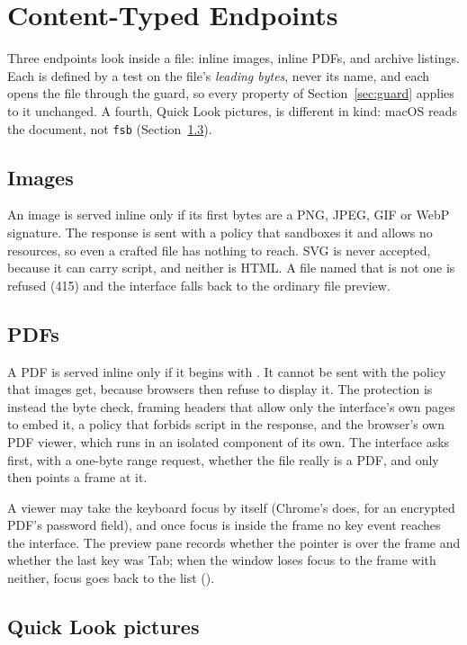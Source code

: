 \section{Content-Typed Endpoints}
\label{sec:content}

Three endpoints look inside a file: inline images, inline PDFs, and archive listings.  Each is
defined by a test on the file's \emph{leading bytes}, never its name, and each opens the file
through the guard, so every property of Section~\ref{sec:guard} applies to it unchanged.  A
fourth, Quick Look pictures, is different in kind: macOS reads the document, not
\texttt{fsb} (Section~\ref{sec:quicklook}).

\subsection{Images}

An image is served inline only if its first bytes are a PNG, JPEG, GIF or WebP signature.
The response is sent with a policy that sandboxes it and allows no resources, so even a
crafted file has nothing to reach.  SVG is never accepted, because it can carry script, and
neither is HTML.  A file named  that is not one is refused (415) and the interface
falls back to the ordinary file preview.

\subsection{PDFs}

A PDF is served inline only if it begins with .  It cannot be sent with the
 policy that images get, because browsers then refuse to display it.  The
protection is instead the byte check, framing headers that allow only the interface's own
pages to embed it, a policy that forbids script in the response, and the browser's own PDF
viewer, which runs in an isolated component of its own.  The interface asks first, with a
one-byte range request, whether the file really is a PDF, and only then points a frame at it.

A viewer may take the keyboard focus by itself (Chrome's does, for an encrypted PDF's
password field), and once focus is inside the frame no key event reaches the interface.  The
preview pane records whether the pointer is over the frame and whether the last key was Tab;
when the window loses focus to the frame with neither, focus goes back to the list
().

\subsection{Quick Look pictures}
\label{sec:quicklook}


